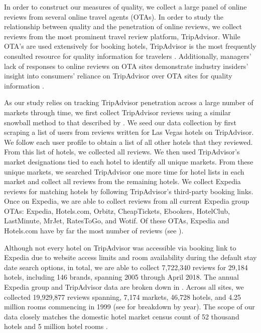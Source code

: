 \documentclass{informs_mod} %
\begin{document}
In order to construct our measures of quality, we collect a large panel of online reviews from several online travel agents (OTAs). In order to study the relationship between quality and the penetration of online reviews, we collect reviews from the most prominent travel review platform, TripAdvisor. While OTA's are used extensively for booking hotels, TripAdvisor is the most frequently consulted resource for quality information for travelers \citep{LVsurvey2016}. Additionally, managers' lack of responses to online reviews on OTA sites demonstrate industry insiders' insight into consumers' reliance on TripAdvisor over OTA sites for quality information \citep{proserpio2017online}.

As our study relies on tracking TripAdvisor penetration across a large number of markets through time, we first collect TripAdvisor reviews using a similar snowball method to that described by \citet{wang2018and}. We seed our data collection by first scraping a list of users from reviews written for Las Vegas hotels on TripAdvisor. We follow each user profile to obtain a list of all other hotels that they reviewed. From this list of hotels, we collected all reviews. We then used TripAdvisor's market designations tied to each hotel to identify all unique markets. From these unique markets, we searched TripAdvisor one more time for hotel lists in each market and collect all reviews from the remaining hotels. We collect Expedia reviews for matching hotels by following TripAdvisor's third-party booking links. Once on Expedia, we are able to collect reviews from all current Expedia group OTAs: Expedia, Hotels.com, Orbitz, CheapTickets, Ebookers, HotelClub, LastMinute, MrJet, RatesToGo, and Wotif. Of these OTAs, Expedia and Hotels.com have by far the most number of reviews (see ).

Although not every hotel on TripAdvisor was accessible via booking link to Expedia due to website access limits and room availability during the default stay date search options, in total, we are able to collect 7,722,340 reviews for 29,184 hotels, including 146 brands, spanning 2005 through April 2018. The annual Expedia group and TripAdvisor data are broken down in . Across all sites, we collected 19,929,877 reviews spanning, 7,174 markets, 46,728 hotels, and 4.25 million rooms commencing in 1999 (see  for breakdown by year). The scope of our data closely matches the domestic hotel market census count of 52 thousand hotels and 5 million hotel rooms \citep{hotelnews2015}. 
\end{document}

